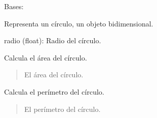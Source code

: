 \documentclass[letterpaper,10pt,spanish]{sphinxmanual}
\begin{document}

\begin{fulllineitems}
\label{\detokenize{pr8:pr8.3.Circulo}}
\pysigstartsignatures
{}
\pysigstopsignatures
\sphinxAtStartPar
Bases: {\hyperref[\detokenize{pr8:pr8.3.Objeto2D}]{}}

\sphinxAtStartPar
Representa un círculo, un objeto bidimensional.
\begin{description}
\sphinxAtStartPar
radio (float): Radio del círculo.

\end{description}

\begin{fulllineitems}
\label{\detokenize{pr8:pr8.3.Circulo.area}}
\pysigstartsignatures
{}
\pysigstopsignatures
\sphinxAtStartPar
Calcula el área del círculo.
\begin{quote}\begin{description}
\sphinxAtStartPar
El área del círculo.

\end{description}\end{quote}

\end{fulllineitems}


\begin{fulllineitems}
\label{\detokenize{pr8:pr8.3.Circulo.perimetro}}
\pysigstartsignatures
{}
\pysigstopsignatures
\sphinxAtStartPar
Calcula el perímetro del círculo.
\begin{quote}\begin{description}
\sphinxAtStartPar
El perímetro del círculo.

\end{description}\end{quote}

\end{fulllineitems}


\end{fulllineitems}
\end{document}
